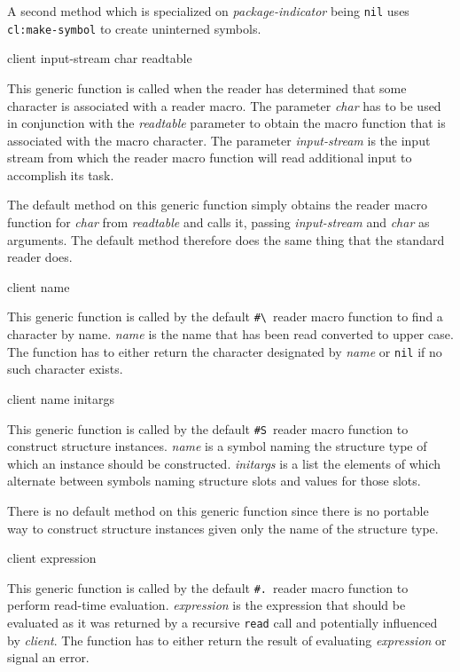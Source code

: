 A second method which is specialized on \textit{package-indicator}
being \texttt{nil} uses \texttt{cl:make-symbol} to create uninterned
symbols.

 {client input-stream char readtable}

This generic function is called when the reader has determined that
some character is associated with a reader macro.  The parameter
\textit{char} has to be used in conjunction with the
\textit{readtable} parameter to obtain the macro function that is
associated with the macro character.  The parameter
\textit{input-stream} is the input stream from which the reader macro
function will read additional input to accomplish its task.

The default method on this generic function simply obtains the reader
macro function for \textit{char} from \textit{readtable} and calls it,
passing \textit{input-stream} and \textit{char} as arguments.  The
default method therefore does the same thing that the standard
\commonlisp{} reader does.

 {client name}

This generic function is called by the default
\texttt{\#\textbackslash}~reader macro function to find a character by
name.  \textit{name} is the name that has been read converted to upper
case.  The function has to either return the character designated by
\textit{name} or \texttt{nil} if no such character exists.

 {client name initargs}

This generic function is called by the default \texttt{\#S}~reader
macro function to construct structure instances.  \textit{name} is a
symbol naming the structure type of which an instance should be
constructed.  \textit{initargs} is a list the elements of which
alternate between symbols naming structure slots and values for those
slots.

There is no default method on this generic function since there is no
portable way to construct structure instances given only the name of
the structure type.

 {client expression}

This generic function is called by the default \texttt{\#.}~reader
macro function to perform read-time evaluation.  \textit{expression}
is the expression that should be evaluated as it was returned by a
recursive \texttt{read} call and potentially influenced by
\textit{client}.  The function has to either return the result of
evaluating \textit{expression} or signal an error.

